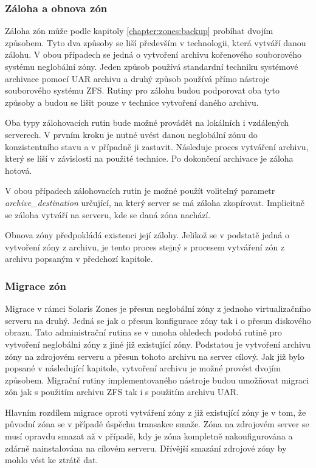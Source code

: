 \subsubsection{Záloha a obnova zón}
\label{chapter:implementation:szones:routines:backup}
Záloha zón může podle kapitoly \ref{chapter:zones:backup} probíhat dvojím způsobem. Tyto dva způsoby se liší především v technologii,
která vytváří danou zálohu. V obou případech se jedná o vytvoření archivu kořenového souborového systému neglobální zóny. Jeden
způsob používá standardní techniku systémové archivace pomocí UAR archivu a druhý způsob používá přímo nástroje souborového
systému ZFS. Rutiny pro zálohu budou podporovat oba tyto způsoby a budou se lišit pouze v technice vytvoření daného archivu.

Oba typy zálohovacích rutin bude možné provádět na lokálních i vzdálených serverech. V prvním kroku je nutné uvést danou neglobální
zónu do konzistentního stavu a v případně ji zastavit. Následuje proces vytváření archivu, který se liší v závislosti na
použité technice. Po dokončení archivace je záloha hotová. 

V obou případech zálohovacích rutin je možné použít volitelný parametr \textit{archive\_destination} určující, na který server 
se má záloha zkopírovat. Implicitně se záloha vytváří na serveru, kde se daná zóna nachází.

Obnova zóny předpokládá existenci její zálohy. Jelikož se v podstatě jedná o vytvoření zóny z archivu, je tento proces stejný s
procesem vytváření zón z archivu popsaným v předchozí kapitole.
\subsubsection{Migrace zón}
\label{chapter:implementation:szones:routines:migration}
Migrace v rámci Solaris Zones je přesun neglobální zóny z jednoho virtualizačního serveru na druhý. Jedná se jak o přesun
konfigurace zóny tak i o přesun diskového obrazu. Tato administrační rutina se v mnoha ohledech podobá rutině pro vytvoření
neglobální zóny z jiné již existující zóny. Podstatou je vytvoření archivu zóny na zdrojovém serveru a přesun tohoto archivu
na server cílový. Jak již bylo popsané v následující kapitole, vytvoření archivu je možné provést dvojím způsobem. Migrační rutiny
implementovaného nástroje budou umožňovat migraci zón jak s použitím archivu ZFS tak i s použitím archivu UAR.

Hlavním rozdílem migrace oproti vytváření zóny z již existující zóny je v tom, že původní zóna se v případě úspěchu transakce smaže.
Zóna na zdrojovém server se musí opravdu smazat až v případě, kdy je zóna kompletně nakonfigurována a zdárně nainstalována na
cílovém serveru. Dřívější smazání zdrojové zóny by mohlo vést ke ztrátě dat.


